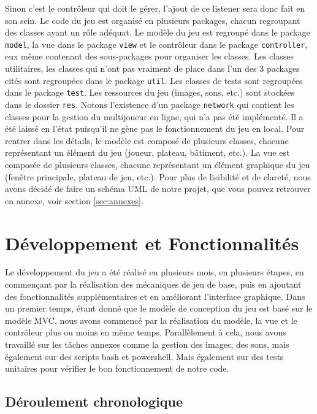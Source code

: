 \documentclass{article}
\begin{document}
    Sinon c'est le contrôleur qui doit le gérer, l'ajout de ce listener sera donc fait en son sein.
    \newline
    Le code du jeu est organisé en plusieurs packages, chacun regroupant des classes ayant un rôle adéquat.
    Le modèle du jeu est regroupé dans le package \texttt{model}, la vue dans le package \texttt{view} et le contrôleur dans le package \texttt{controller}, eux même contenant des sous-packages pour organiser les classes.
    Les classes utilitaires, les classes qui n'ont pas vraiment de place dans l'un des 3 packages cités sont regroupées dans le package \texttt{util}.
    Les classes de tests sont regroupées dans le package \texttt{test}.
    Les ressources du jeu (images, sons, etc.) sont stockées dans le dossier \texttt{res}.
    Notons l'existence d'un package \texttt{network} qui contient les classes pour la gestion du multijoueur en ligne, qui n'a pas été implémenté.
    Il a été laissé en l'état puisqu'il ne gène pas le fonctionnement du jeu en local.
    Pour rentrer dans les détails, le modèle est composé de plusieurs classes, chacune représentant un élément du jeu (joueur, plateau, bâtiment, etc.).
    La vue est composée de plusieurs classes, chacune représentant un élément graphique du jeu (fenêtre principale, plateau de jeu, etc.).
    Pour plus de lisibilité et de clareté, nous avons décidé de faire un schéma UML de notre projet, que vous pouvez retrouver en annexe, voir section \ref{sec:annexes}.

    \section{Développement et Fonctionnalités}\label{sec:developpement-et-fonctionnalites}

    Le développement du jeu a été réalisé en plusieurs mois, en plusieurs étapes, en commençant par la réalisation des mécaniques de jeu de base, puis en ajoutant des fonctionnalités supplémentaires et en améliorant l'interface graphique.
    Dans un premier temps, étant donné que le modèle de conception du jeu est basé sur le modèle MVC, nous avons commencé par la réalisation du modèle, la vue et le contrôleur plus ou moins en même temps.
    Parallèlement à cela, nous avons travaillé sur les tâches annexes comme la gestion des images, des sons, mais également sur des scripts bash et powershell.
    Mais également sur des tests unitaires pour vérifier le bon fonctionnement de notre code.

    \subsection{Déroulement chronologique}\label{subsec:deroulement-chronologique}
\end{document}

